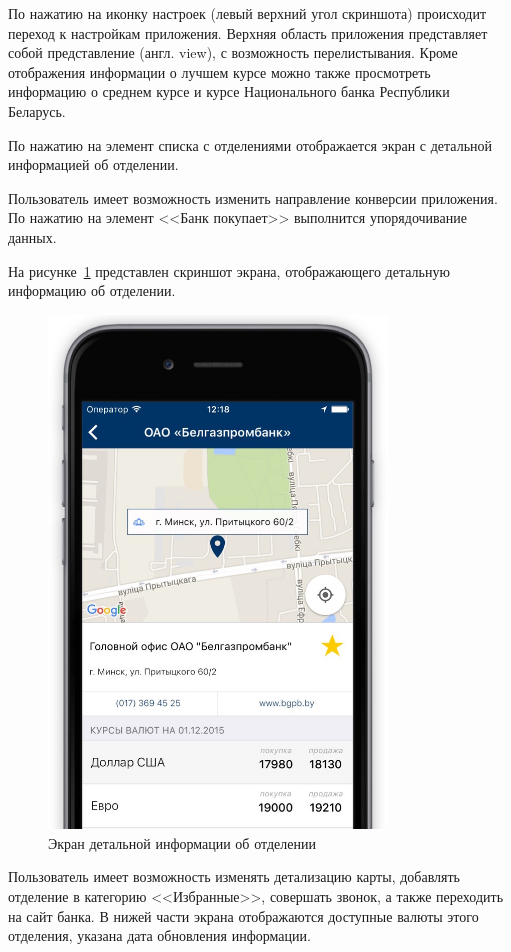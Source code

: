 По нажатию на иконку настроек (левый верхний угол скриншота)
происходит переход к настройкам приложения. Верхняя область
приложения представляет собой представление (англ. view),
с возможность перелистывания. Кроме отображения информации
о лучшем курсе можно также просмотреть информацию о среднем
курсе и курсе Национального банка Республики Беларусь. 

По нажатию на элемент списка с отделениями отображается
экран с детальной информацией об отделении.

Пользователь имеет возможность изменить направление
конверсии приложения. По нажатию на элемент <<Банк покупает>>
выполнится упорядочивание данных. 

\pagebreak

На рисунке~\ref{fig:screen_details} представлен скриншот экрана, отображающего
детальную информацию об отделении.

\begin{figure}[h!]
  \centering
  \includegraphics[width=90mm]{pic/screen_details}
  \caption{Экран детальной информации об отделении}
  \label{fig:screen_details}
\end{figure}

Пользователь имеет возможность изменять детализацию карты,
добавлять отделение в категорию <<Избранные>>, совершать
звонок, а также переходить на сайт банка. В нижей части
экрана отображаются доступные валюты этого отделения,
указана дата обновления информации. 


